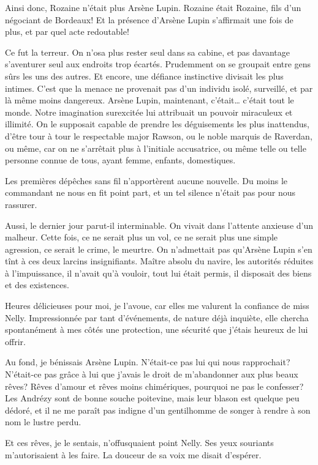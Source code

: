 \documentclass[12pt,a4paper]{book}
\begin{document}
Ainsi donc, Rozaine n’était plus Arsène Lupin. Rozaine était Rozaine, fils d’un négociant de Bordeaux! Et la présence d’Arsène Lupin s’affirmait une fois de plus, et par quel acte redoutable!

Ce fut la terreur. On n’osa plus rester seul dans sa cabine, et pas davantage s’aventurer seul aux endroits trop écartés. Prudemment on se groupait entre gens sûrs les uns des autres. Et encore, une défiance instinctive divisait les plus intimes. C’est que la menace ne provenait pas d’un individu isolé, surveillé, et par là même moins dangereux. Arsène Lupin, maintenant, c’était… c’était tout le monde. Notre imagination surexcitée lui attribuait un pouvoir miraculeux et illimité. On le supposait capable de prendre les déguisements les plus inattendus, d’être tour à tour le respectable major Rawson, ou le noble marquis de Raverdan, ou même, car on ne s’arrêtait plus à l’initiale accusatrice, ou même telle ou telle personne connue de tous, ayant femme, enfants, domestiques.

Les premières dépêches sans fil n’apportèrent aucune nouvelle. Du moins le commandant ne nous en fit point part, et un tel silence n’était pas pour nous rassurer.

Aussi, le dernier jour parut-il interminable. On vivait dans l’attente anxieuse d’un malheur. Cette fois, ce ne serait plus un vol, ce ne serait plus une simple agression, ce serait le crime, le meurtre. On n’admettait pas qu’Arsène Lupin s’en tînt à ces deux larcins insignifiants. Maître absolu du navire, les autorités réduites à l’impuissance, il n’avait qu’à vouloir, tout lui était permis, il disposait des biens et des existences.

Heures délicieuses pour moi, je l’avoue, car elles me valurent la confiance de miss Nelly. Impressionnée par tant d’événements, de nature déjà inquiète, elle chercha spontanément à mes côtés une protection, une sécurité que j’étais heureux de lui offrir.

Au fond, je bénissais Arsène Lupin. N’était-ce pas lui qui nous rapprochait? N’était-ce pas grâce à lui que j’avais le droit de m’abandonner aux plus beaux rêves? Rêves d’amour et rêves moins chimériques, pourquoi ne pas le confesser? Les Andrézy sont de bonne souche poitevine, mais leur blason est quelque peu dédoré, et il ne me paraît pas indigne d’un gentilhomme de songer à rendre à son nom le lustre perdu.

Et ces rêves, je le sentais, n’offusquaient point Nelly. Ses yeux souriants m’autorisaient à les faire. La douceur de sa voix me disait d’espérer.
\end{document}
